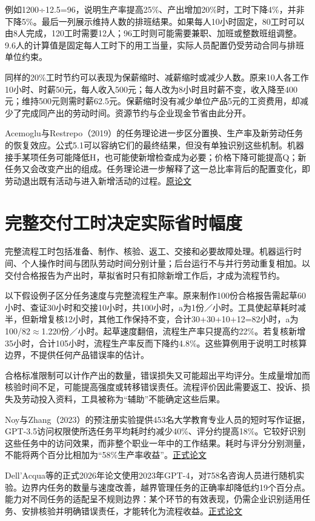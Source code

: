 \documentclass[UTF8,fontset=windows,12pt,a4paper,oneside,openany]{ctexbook}
\begin{document}
例如1200÷12.5=96，说明生产率提高25\%、产出增加20\%时，工时下降4\%，并非下降5\%。最后一列展示维持人数的排班结果。如果每人10小时固定，80工时可以由8人完成，120工时需要12人；96工时则可能需要兼职、加班或整数班组调整。9.6人的计算值是固定每人工时下的用工当量，实际人员配置仍受劳动合同与排班单位约束。

同样的20\%工时节约可以表现为保薪缩时、减薪缩时或减少人数。原来10人各工作10小时、时薪50元，每人收入500元；每人改为8小时且时薪不变，收入降至400元；维持500元则需时薪62.5元。保薪缩时没有减少单位产品5元的工资费用，却减少了完成同产出的劳动时间。资源节约与企业现金节省由此分开。

Acemoglu与Restrepo（2019）的任务理论进一步区分置换、生产率及新劳动任务的恢复效应。公式5.1可以容纳它们的最终结果，但没有单独识别这些机制。机器接手某项任务可能降低H，也可能使新增检查成为必要；价格下降可能提高Q；新任务又会改变产出的组成。任务理论进一步解释了这一总比率背后的配置变化，即劳动退出既有活动与进入新增活动的过程。\href{https://doi.org/10.1257/jep.33.2.3}{原论文}

\section{完整交付工时决定实际省时幅度}

完整流程工时包括准备、制作、核验、返工、交接和必要故障处理。机器运行时间、个人操作时间与团队劳动时间分别计量；后台运行不与并行劳动重复相加。以交付合格报告为产出时，草拟省时只有扣除新增工作后，才成为流程节约。

以下假设例子区分任务速度与完整流程生产率。原来制作100份合格报告需起草60小时、查证30小时和交接10小时，共100小时，a为1份／小时。工具使起草耗时减半，但新增复核12小时，其他工作保持不变，合计30+30+10+12=82小时，a为100/82\ensuremath{\approx}1.220份／小时。起草速度翻倍，流程生产率只提高约22\%。若复核新增35小时，合计105小时，流程生产率反而下降约4.8\%。这些算例用于说明工时核算边界，不提供任何产品错误率的估计。

合格标准限制可以计作产出的数量，错误损失又可能超出平均评分。生成量增加而核验时间不足，可能提高强度或转移错误责任。流程评价因此需要返工、投诉、损失及劳动投入资料，工具被称为“辅助”不能确定这些后果。

Noy与Zhang（2023）的预注册实验提供453名大学教育专业人员的短时写作证据，GPT-3.5访问权限使所选任务平均耗时约减少40\%、评分约提高18\%。它较好识别这些任务中的访问效果，而非整个职业一年中的工作结果。耗时与评分分别测量，不能将两个百分比相加为“58\%生产率收益”。\href{https://doi.org/10.1126/science.adh2586}{正式论文}

Dell’Acqua等的正式2026年论文使用2023年GPT-4，对758名咨询人员进行随机实验。边界内任务的数量与速度改善，越界管理任务的正确率却降低约19个百分点。能力对不同任务的适配呈不规则边界：某个环节的有效表现，仍需企业识别适用任务、安排核验并明确错误责任，才能转化为流程收益。\href{https://doi.org/10.1287/orsc.2025.21838}{正式论文}
\end{document}

